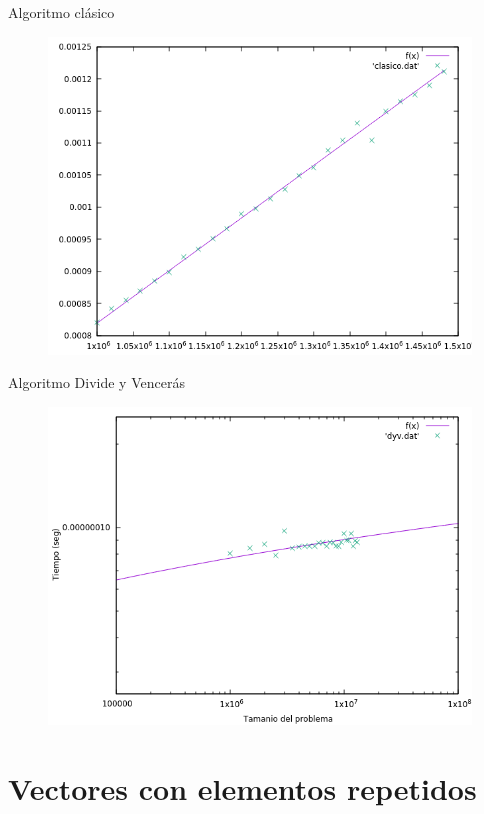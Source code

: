 \documentclass{beamer}
\begin{document}
\begin{frame}[fragile]{Algoritmo clásico}
\begin{figure}[H]
\centering
\includegraphics[scale=0.5]{hibrida_clasico.png}
\end{figure}
\end{frame}

\begin{frame}[fragile]{Algoritmo Divide y Vencerás}
\begin{figure}[H]
\centering
\includegraphics[scale=0.5]{hibrida_dyv.png}
\end{figure}
\end{frame}

\section{Vectores con elementos repetidos}
\end{document}
